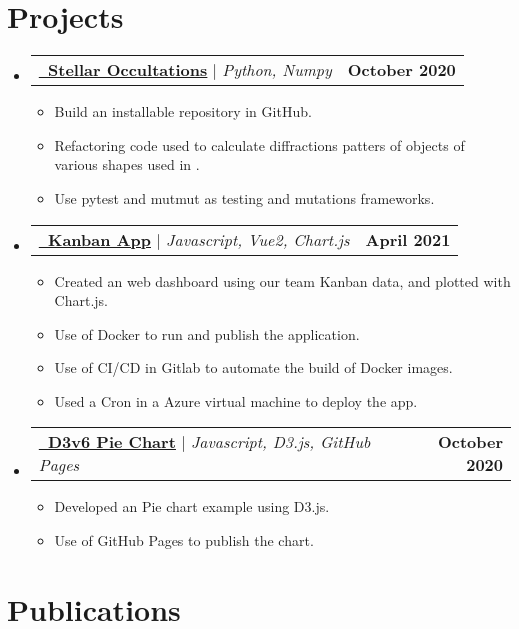 \documentclass[letterpaper,11pt]{article}
\makeatletter
\newcommand{\resumeItem}[1]{
  \item\small{
    {#1 \vspace{-2pt}}
  }
}
\newcommand{\resumeProjectHeading}[2]{
    \item
    \begin{tabular*}{1.001\textwidth}{l@{\extracolsep{\fill}}r}
      \small#1 & \textbf{\small #2}\\
    \end{tabular*}\vspace{-7pt}
}
\newcommand{\resumeSubHeadingListStart}{\begin{itemize}[leftmargin=0.0in, label={}]}
\newcommand{\resumeSubHeadingListEnd}{\end{itemize}}
\newcommand{\resumeItemListStart}{\begin{itemize}}
\newcommand{\resumeItemListEnd}{\end{itemize}\vspace{-5pt}}
\makeatother
\begin{document}
\section{Projects}
    \resumeSubHeadingListStart
      \resumeProjectHeading
          {\textbf{\href{https://github.com/ferwazz/stellar_occultations}{\raisebox{-0.2\height}\faGithub\ \underline{Stellar Occultations}}} $|$ \emph{Python, Numpy}}{October 2020}
          \resumeItemListStart
            \resumeItem{Build an installable repository in GitHub.}
            \resumeItem{Refactoring code used to calculate diffractions patters of objects of various shapes used in \cite{castro2019occultations}.}
            \resumeItem{Use pytest and mutmut as testing and mutations frameworks.}
          \resumeItemListEnd
          \vspace{-13pt} 
      \resumeProjectHeading
          {\textbf{\href{http://islasgeci.org:8501/}{\raisebox{-0.2\height}\faGitlab\ \underline{Kanban App}} } $|$ \emph{Javascript, Vue2, Chart.js}}{April 2021}
          \resumeItemListStart
            \resumeItem{Created an web dashboard using our team Kanban data, and plotted with Chart.js.}
            \resumeItem{Use of Docker to run and publish the application.}
            \resumeItem{Use of CI/CD in Gitlab to automate the build of Docker images.}
            \resumeItem{Used a Cron in a Azure virtual machine to deploy the app.}
          \resumeItemListEnd 
          \vspace{-13pt}
      \resumeProjectHeading
          {\textbf{\href{https://ferwazz.github.io/d3examples/}{\raisebox{-0.2\height}\faGithub\ \underline{D3v6 Pie Chart}}} $|$ \emph{Javascript, D3.js, GitHub Pages}}{October 2020}
          \resumeItemListStart
            \resumeItem{Developed an Pie chart example using D3.js.}
            \resumeItem{Use of GitHub Pages to publish the chart.}
          \resumeItemListEnd
      \resumeSubHeadingListEnd
\vspace{-15pt}



\section{Publications}
    \nocite{*}
    \begingroup
    \renewcommand{\section}[2]{}%
    
    
    \endgroup
\end{document}
